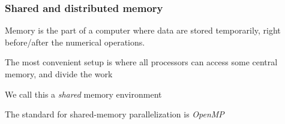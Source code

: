 \documentclass[aspectratio=43,9pt]{beamer}
\begin{document}
\begin{frame}
	\frametitle{Shared and distributed memory}
	\begin{myitemize}{2ex}
		\item Memory is the part of a computer where data are stored temporarily, right before/after the numerical operations.
		\item The most convenient setup is where all processors can access some central memory, and divide the work 
			\begin{center}
			\end{center}
		\item We call this a \emph{shared} memory environment
		\item The standard for shared-memory parallelization is \emph{OpenMP}
	\end{myitemize}
\end{frame}
%
%
\end{document}
